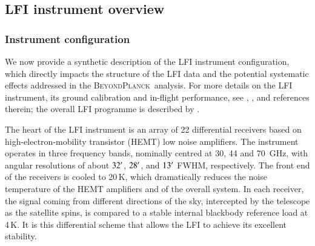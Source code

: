 \documentclass[twocolumn]{aa}
\newcommand{\BP}{\textsc{BeyondPlanck}}
\begin{document}
\subsection{LFI instrument overview}
\subsubsection{Instrument configuration}

We now provide a synthetic description of the LFI instrument
configuration, which directly impacts the structure of the LFI data
and the potential systematic effects addressed in the \BP\ 
analysis. For more details on the LFI instrument, its ground
calibration and in-flight performance, see
\cite{bersanelli2010}, \citet{planck2011-1.4}, and references therein; the
overall LFI programme is described by \citet{mandolesi2010}.

The heart of the LFI instrument is an array of 22 differential
receivers based on high-electron-mobility transistor (HEMT) low noise
amplifiers. The instrument operates in three frequency bands,
nominally centred at 30, 44 and 70~GHz, with angular resolutions of
about $32\arcm$, $28\arcm$, and $13\arcm$ FWHM, respectively.  The front end of the
receivers is cooled to 20\,K, which dramatically reduces the noise
temperature of the HEMT amplifiers and of the overall system.  In each
receiver, the signal coming from different directions of the sky,
intercepted by the telescope as the satellite spins, is compared to a
stable internal blackbody reference load at 4\,K. It is this
differential scheme that allows the LFI to achieve its excellent
stability.
\end{document}
